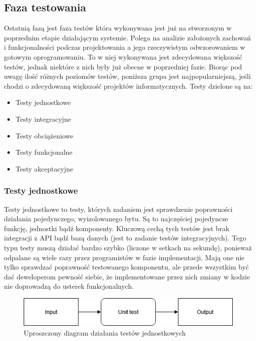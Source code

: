 \documentclass[oneside,polski,logo]{amuthesis}
\begin{document}
\subsection {Faza testowania}
Ostatnią fazą jest faza testów która wykonywana jest już na stworzonym w poprzednim etapie działającym systemie. Polega na analizie założonych zachowań i funkcjonalności podczas projektowania a jego rzeczywistym odwzorowaniem w gotowym oprogramowaniu. To w niej wykonywana jest zdecydowana większość testów, jednak niektóre z nich były już obecne w poprzedniej fazie. Biorąc pod uwagę ilość różnych poziomów testów, poniższa grupa jest najpopularniejszą, jeśli chodzi o zdecydowaną większość projektów informatycznych. Testy dzielone są na:\\

\begin{itemize}
	\item Testy jednostkowe
	\item Testy integracyjne
	\item Testy obciążeniowe
	\item Testy funkcjonalne
	\item Testy akceptacyjne \\
\end{itemize}

\subsubsection {Testy jednostkowe}
Testy jednostkowe to testy, których zadaniem jest sprawdzenie poprawności działania pojedynczego, wyizolowanego bytu. Są to najczęściej pojedyncze funkcję, jednostki bądź komponenty. Kluczową cechą tych testów jest brak integracji z API bądź bazą danych (jest to zadanie testów integracyjnych). Tego typu testy muszą działać bardzo szybko (liczone w setkach na sekundę), ponieważ odpalane są wiele razy przez programistów w fazie implementacji. Mają one nie tylko sprawdzać poprawność testowanego komponentu, ale przede wszystkim być dać deweloperom pewność siebie, że implementowane przez nich zmiany w kodzie nie doprowadzą do usterek funkcjonalnych.\cite{testJ}\\

\begin{figure}[h]
	\centering
	\includegraphics[width=12cm]{images/hyps/unit-test-flow.png}
	\caption{Uproszczony diagram działania testów jednostkowych}
\end{figure}
\end{document}
